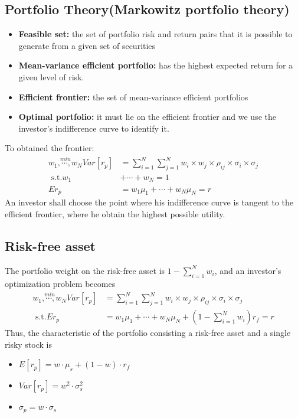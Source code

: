 \documentclass{article}
\theoremstyle{definition}
\theoremstyle{thrm}
\theoremstyle{lma}
\theoremstyle{ppst}
\theoremstyle{crlr}
\begin{document}
\subsection{Portfolio Theory(Markowitz portfolio theory)}
\begin{itemize}
	\item \textbf{Feasible set: }the set of portfolio risk and return pairs that it is possible to generate from a given set of securities
	\item \textbf{Mean-variance efficient portfolio:} has the highest expected return for a given level of risk.
	\item \textbf{Efficient frontier:} the set of mean-variance efficient portfolios
	\item \textbf{Optimal portfolio:} it must lie on the efficient frontier and we use the investor's indifference curve to identify it. 
\end{itemize}
To obtained the frontier:
\begin{align*}
	\stackrel{min}{w_1,\cdots,w_N} Var[r_p] &= \sum_{i=1}^N\sum_{j=1}^N w_i\times w_j \times \rho_{ij}\times \sigma_i\times \sigma_j \\
	\text{ s.t.} w_1&+\cdots+w_N = 1\\
	E{r_p} &= w_1\mu_1+\cdots+w_N\mu_N = r
\end{align*}
An investor shall choose the point where his indifference curve is tangent to the efficient frontier, where he obtain the highest possible utility.
\subsection{Risk-free asset}
The portfolio weight on the risk-free asset is $1-\sum_{i=1}^Nw_i$, and an investor's optimization problem becomes
\begin{align*}
	\stackrel{min}{w_1,\cdots,w_N} Var[r_p] &= \sum_{i=1}^N\sum_{j=1}^N w_i\times w_j \times \rho_{ij}\times \sigma_i\times \sigma_j \\
	\text{ s.t.} E{r_p} &= w_1\mu_1+\cdots+w_N\mu_N +(1-\sum_{i=1}^Nw_i)r_f= r
\end{align*}
Thus, the characteristic of the portfolio consisting a risk-free asset and a single risky stock is
\begin{itemize}
	\item $E[r_p] = w\cdot \mu_s+(1-w)\cdot r_f$
	\item $Var[r_p] = w^2\cdot \sigma_s^2$
	\item $\sigma_p = w\cdot \sigma_s$
\end{itemize}
\end{document}
